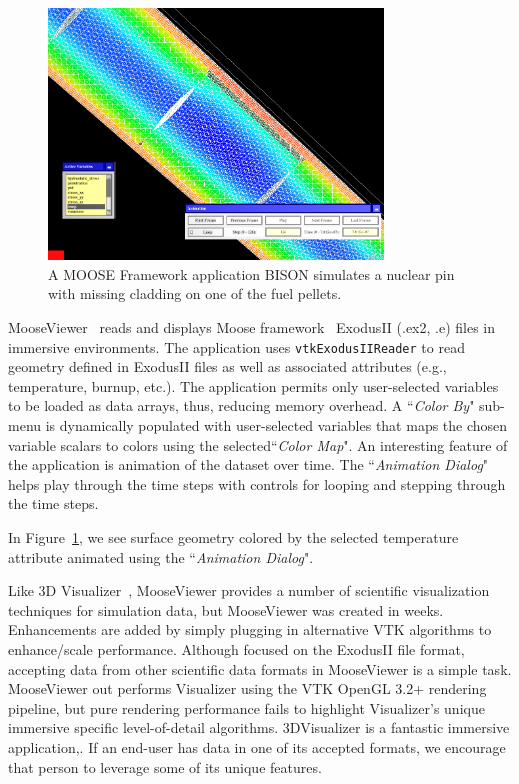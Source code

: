 \begin{figure}[h!]
 \centering
 \includegraphics[width=3.5in]{images/fuelpin.png}
 \caption{A MOOSE Framework application BISON simulates a nuclear pin with missing cladding on one of the fuel pellets.}
 \label{fig:fuelpin}
\end{figure}

MooseViewer~\cite{MooseViewer} reads and displays Moose framework~\cite{Gaston:2015, MooseFramework} ExodusII (.ex2, .e) files in immersive environments. The application uses \texttt{vtkExodusIIReader} to read geometry defined in ExodusII files as well as associated attributes (e.g., temperature, burnup, etc.). The application permits only user-selected variables to be loaded as data arrays, thus, reducing memory overhead. A ``\textit{Color By}" sub-menu is dynamically populated with user-selected variables that maps the chosen variable scalars to colors using the selected``\textit{Color Map}".
An interesting feature of the application is animation of the dataset over time.
The ``\textit{Animation Dialog}" helps play through the time steps with controls for looping and stepping through the time steps.

In Figure~\ref{fig:fuelpin}, we see surface geometry colored by the selected temperature attribute animated using the ``\textit{Animation Dialog}".

Like 3D Visualizer~\cite{Billen:2008}, MooseViewer provides a number of scientific visualization techniques for simulation data, but MooseViewer was created in weeks. Enhancements are added by simply plugging in alternative VTK algorithms to enhance/scale performance.  Although focused on the ExodusII file format, accepting data from other scientific data formats in MooseViewer is a simple task. MooseViewer out performs Visualizer using the VTK OpenGL 3.2+ rendering pipeline, but pure rendering performance fails to highlight Visualizer's unique immersive specific level-of-detail algorithms. 3DVisualizer is a fantastic immersive application,. If an end-user has data in one of its accepted formats, we encourage that person to leverage some of its unique features.

